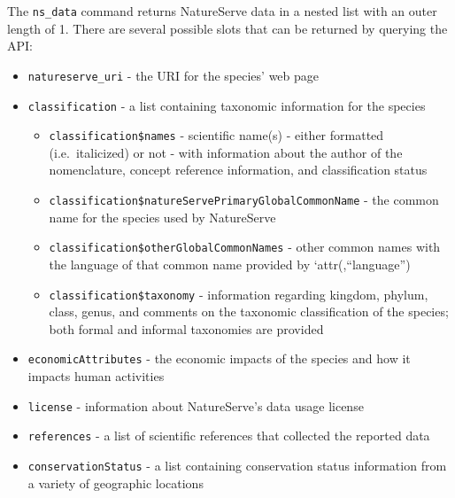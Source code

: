 \documentclass[]{article}
\providecommand{\tightlist}{%
  \setlength{\itemsep}{0pt}\setlength{\parskip}{0pt}}
\begin{document}
The \texttt{ns\_data} command returns NatureServe data in a nested list
with an outer length of 1. There are several possible slots that can be
returned by querying the API:

\begin{itemize}
\tightlist
\item
  \texttt{natureserve\_uri} - the URI for the species' web page
\item
  \texttt{classification} - a list containing taxonomic information for
  the species

  \begin{itemize}
  \tightlist
  \item
    \texttt{classification\$names} - scientific name(s) - either
    formatted (i.e.~italicized) or not - with information about the
    author of the nomenclature, concept reference information, and
    classification status
  \item
    \texttt{classification\$natureServePrimaryGlobalCommonName} - the
    common name for the species used by NatureServe
  \item
    \texttt{classification\$otherGlobalCommonNames} - other common names
    with the language of that common name provided by
    `attr(,``language'')
  \item
    \texttt{classification\$taxonomy} - information regarding kingdom,
    phylum, class, genus, and comments on the taxonomic classification
    of the species; both formal and informal taxonomies are provided
  \end{itemize}
\item
  \texttt{economicAttributes} - the economic impacts of the species and
  how it impacts human activities
\item
  \texttt{license} - information about NatureServe's data usage license
\item
  \texttt{references} - a list of scientific references that collected
  the reported data
\item
  \texttt{conservationStatus} - a list containing conservation status
  information from a variety of geographic locations


\end{itemize}
\end{document}
